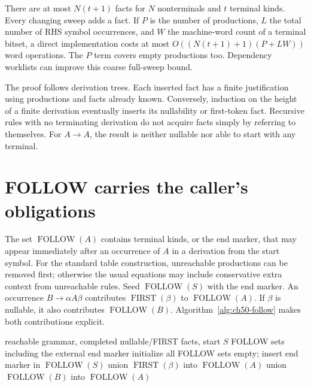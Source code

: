 There are at most $N(t+1)$ facts for $N$ nonterminals and $t$ terminal kinds.
Every changing sweep adds a fact.
If $P$ is the number of productions, $L$ the total number of RHS symbol occurrences, and $W$ the machine-word count of a terminal bitset, a direct implementation costs at most $O((N(t+1)+1)(P+LW))$ word operations.
The $P$ term covers empty productions too.
Dependency worklists can improve this coarse full-sweep bound.

The proof follows derivation trees.
Each inserted fact has a finite justification using productions and facts already known.
Conversely, induction on the height of a finite derivation eventually inserts its nullability or first-token fact.
Recursive rules with no terminating derivation do not acquire facts simply by referring to themselves.
For $A\to A$, the result is neither nullable nor able to start with any terminal.

\section{FOLLOW carries the caller's obligations}
\label{sec:ch50-follow}

The set $\operatorname{FOLLOW}(A)$ contains terminal kinds, or the end marker, that may appear immediately after an occurrence of $A$ in a derivation from the start symbol.
For the standard table construction, unreachable productions can be removed first; otherwise the usual equations may include conservative extra context from unreachable rules.
Seed $\operatorname{FOLLOW}(S)$ with the end marker.
An occurrence $B\to\alpha A\beta$ contributes $\operatorname{FIRST}(\beta)$ to $\operatorname{FOLLOW}(A)$.
If $\beta$ is nullable, it also contributes $\operatorname{FOLLOW}(B)$.
Algorithm~\ref{alg:ch50-follow} makes both contributions explicit.

\begin{algorithm}[htbp]
\caption{Propagate followers through nullable suffixes.}
\label{alg:ch50-follow}
\begin{pseudocode}
\Require reachable grammar, completed nullable/FIRST facts, start $S$
\Ensure FOLLOW sets including the external end marker
\State initialize all FOLLOW sets empty; insert end marker in $\operatorname{FOLLOW}(S)$
\Repeat
    \State union $\operatorname{FIRST}(\beta)$ into $\operatorname{FOLLOW}(A)$
      \State union $\operatorname{FOLLOW}(B)$ into $\operatorname{FOLLOW}(A)$
    \EndIf
  \EndFor
{}
\end{pseudocode}
\end{algorithm}

